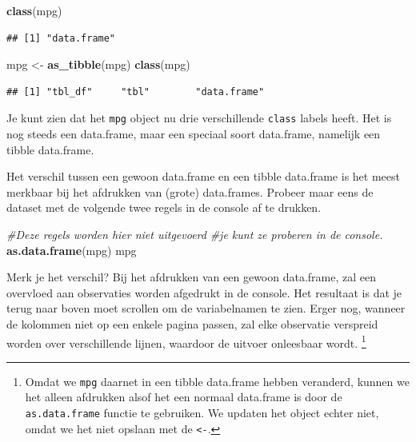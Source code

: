 \documentclass[]{tufte-book}
\newenvironment{Shaded}{}{}
\newcommand{\CommentTok}[1]{\textcolor[rgb]{0.38,0.63,0.69}{\textit{#1}}}
\newcommand{\KeywordTok}[1]{\textcolor[rgb]{0.00,0.44,0.13}{\textbf{#1}}}
\newcommand{\NormalTok}[1]{#1}
\newcommand{\StringTok}[1]{\textcolor[rgb]{0.25,0.44,0.63}{#1}}
\begin{document}
\begin{Shaded}
\begin{Highlighting}[]
\KeywordTok{class}\NormalTok{(mpg)}
\end{Highlighting}
\end{Shaded}

\begin{verbatim}
## [1] "data.frame"
\end{verbatim}

\begin{Shaded}
\begin{Highlighting}[]
\NormalTok{mpg <-}\StringTok{ }\KeywordTok{as_tibble}\NormalTok{(mpg)}
\KeywordTok{class}\NormalTok{(mpg)}
\end{Highlighting}
\end{Shaded}

\begin{verbatim}
## [1] "tbl_df"     "tbl"        "data.frame"
\end{verbatim}

Je kunt zien dat het \texttt{mpg} object nu drie verschillende \texttt{class} labels heeft. Het is nog steeds een data.frame, maar een speciaal soort data.frame, namelijk een tibble data.frame.

Het verschil tussen een gewoon data.frame en een tibble data.frame is het meest merkbaar bij het afdrukken van (grote) data.frames. Probeer maar eens de dataset met de volgende twee regels in de console af te drukken.

\begin{Shaded}
\begin{Highlighting}[]
\CommentTok{#Deze regels worden hier niet uitgevoerd }
\CommentTok{#je kunt ze proberen in de console.}
\KeywordTok{as.data.frame}\NormalTok{(mpg)}
\NormalTok{mpg}
\end{Highlighting}
\end{Shaded}

Merk je het verschil? Bij het afdrukken van een gewoon data.frame, zal een overvloed aan observaties worden afgedrukt in de console. Het resultaat is dat je terug naar boven moet scrollen om de variabelnamen te zien. Erger nog, wanneer de kolommen niet op een enkele pagina passen, zal elke observatie verspreid worden over verschillende lijnen, waardoor de uitvoer onleesbaar wordt. \footnote{Omdat we \texttt{mpg} daarnet in een tibble data.frame hebben veranderd, kunnen we het alleen afdrukken alsof het een normaal data.frame is door de \texttt{as.data.frame} functie te gebruiken. We updaten het object echter niet, omdat we het niet opslaan met de \texttt{\textless{}-}.}
\end{document}
